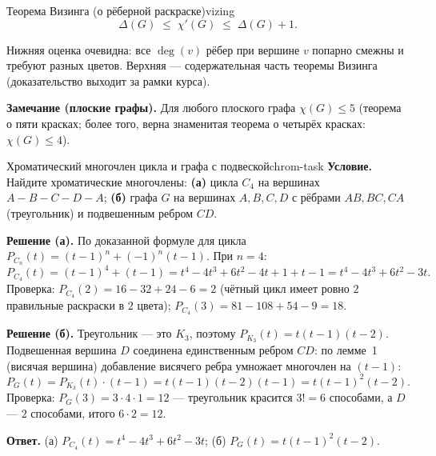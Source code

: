 \begin{statement}{Теорема Визинга (о рёберной раскраске)}{vizing}
\[
  \Delta(G) \;\leq\; \chi'(G) \;\leq\; \Delta(G) + 1.
\]
\end{statement}

Нижняя оценка очевидна: все $\deg(v)$ рёбер при вершине $v$ попарно
смежны и требуют разных цветов. Верхняя --- содержательная часть
теоремы Визинга (доказательство выходит за рамки курса).

\medskip
\textbf{Замечание (плоские графы).} Для любого плоского графа
$\chi(G) \leq 5$ (теорема о пяти красках; более того, верна знаменитая
теорема о четырёх красках: $\chi(G) \le 4$).

\begin{task}{Хроматический многочлен цикла и графа с подвеской}{chrom-task}
\textbf{Условие.} Найдите хроматические многочлены: \textbf{(а)} цикла $C_4$ на
вершинах $A\!-\!B\!-\!C\!-\!D\!-\!A$; \textbf{(б)} графа $G$ на вершинах
$A,B,C,D$ с рёбрами $AB,BC,CA$ (треугольник) и подвешенным ребром $CD$.

\smallskip
\textbf{Решение (а).} По доказанной формуле для цикла
$P_{C_n}(t)=(t-1)^n+(-1)^n(t-1)$. При $n=4$:
\[
  P_{C_4}(t)=(t-1)^4+(t-1)=t^4-4t^3+6t^2-4t+1+t-1=t^4-4t^3+6t^2-3t.
\]
Проверка: $P_{C_4}(2)=16-32+24-6=2$ (чётный цикл имеет ровно $2$ правильные
раскраски в $2$ цвета); $P_{C_4}(3)=81-108+54-9=18$.

\smallskip
\textbf{Решение (б).} Треугольник --- это $K_3$, поэтому $P_{K_3}(t)=t(t-1)(t-2)$.
Подвешенная вершина $D$ соединена единственным ребром $CD$: по лемме~1
(висячая вершина) добавление висячего ребра умножает многочлен на $(t-1)$:
\[
  P_G(t)=P_{K_3}(t)\cdot(t-1)=t(t-1)(t-2)(t-1)=t(t-1)^2(t-2).
\]
Проверка: $P_G(3)=3\cdot4\cdot1=12$ --- треугольник красится $3!=6$ способами,
а $D$ --- $2$ способами, итого $6\cdot2=12$.

\textbf{Ответ.} (а) $P_{C_4}(t)=t^4-4t^3+6t^2-3t$;\quad
(б) $P_G(t)=t(t-1)^2(t-2)$.
\end{task}

